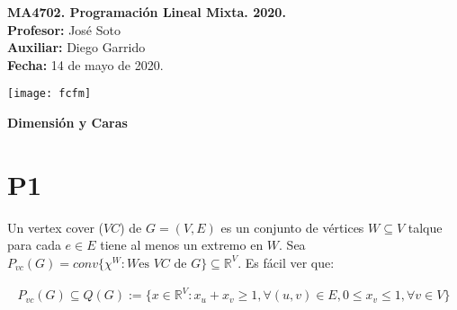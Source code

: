 \documentclass[10pt]{article}
\theoremstyle{plain}
\theoremstyle{definition}
\newcommand{\sca}{Diego Garrido}
\newcommand{\fecha}{14 de mayo  de 2020}
\begin{document}
\vspace*{-1.2 cm}
\begin{minipage}{0.6\textwidth}
\begin{flushleft}
\hspace*{-0.5cm}\textbf{MA4702. Programación Lineal Mixta. 2020.}\\
\hspace*{-0.5cm}\textbf{Profesor:} José Soto\\
\hspace*{-0.5cm}\textbf{Auxiliar:} \sca\\
\hspace*{-0.5cm}\textbf{Fecha:} \fecha.
\end{flushleft}
\end{minipage}
\begin{minipage}{0.36\textwidth}
\begin{flushright}
\texttt{[image: fcfm]}
\end{flushright}
\end{minipage}
\bigskip

\begin{center}
\LARGE\textbf{Dimensión y Caras}
\end{center}


\section{P1}
Un vertex cover ($VC$) de $G=(V,E)$ es un conjunto de vértices $W\subseteq V$ talque para cada $e \in E$ tiene al menos un extremo en $W$. Sea $P_{vc}(G)=conv\{\chi^{W}:W \text{es } VC \text{ de } G\} \subseteq\mathbb{R}^{V}$. Es fácil ver que:

\begin{align*}
  P_{vc}(G)\subseteq Q(G):=\{x\in\mathbb{R}^{V}:x_{u}+x_{v}\geq 1, \forall (u,v) \in E, 0\leq x_{v} \leq 1, \forall v \in V\}
\end{align*}
\end{document}

